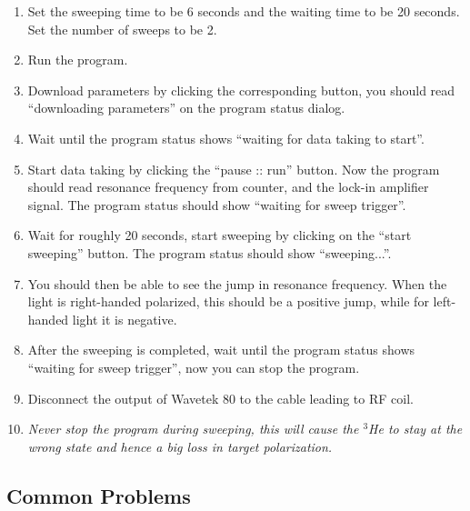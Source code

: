 \begin{enumerate} 
\item Set the sweeping time to be 6 seconds and the waiting time to be 20 seconds.  
Set the number of sweeps to be 2.
\item Run the program.
\item Download parameters by clicking the corresponding button, you should read 
``downloading parameters'' on the program status dialog.
\item Wait until the program status shows ``waiting for data taking to start''.
\item Start data taking by clicking the ``pause :: run'' button.  Now the program 
should read resonance frequency from counter, and the lock-in amplifier signal.  
The program status should show ``waiting for sweep trigger''.
\item Wait for roughly 20 seconds, start sweeping by clicking on the ``start
sweeping'' button. The program status should show ``sweeping...''.
\item You should then be able to see the jump in resonance frequency.  When the light
is right-handed polarized, this should be a positive jump, while for left-handed
light it is negative.
\item After the sweeping is completed, wait until the program status shows ``waiting 
for sweep trigger'', now you can stop the program.

\item Disconnect the output of Wavetek 80 to the cable leading to RF coil.

\item \emph{Never stop the program during sweeping, this will cause the $^3$He
 to stay 
at the wrong state and hence a big loss in target polarization. }
\end{enumerate}        

\subsection{Common Problems}

